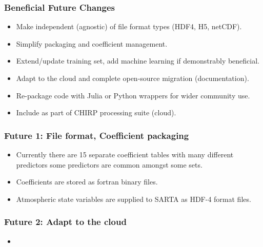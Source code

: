 \documentclass[10pt,t]{beamer}
\begin{document}
\begin{frame}
\end{frame}

\begin{frame}
  \frametitle{Beneficial Future Changes}
  \begin{itemize}
    \item Make independent (agnostic) of file format types (HDF4, H5, netCDF).
    \item Simplify packaging and coefficient management.
    \item Extend/update training set, add machine learning if demonstrably beneficial.
    \item Adapt to the cloud and complete open-source migration (documentation).
    \item Re-package code with Julia or Python wrappers for wider community use.
    \item Include as part of CHIRP processing suite (cloud).

\end{itemize}
\end{frame}

\begin{frame}
  \frametitle{Future 1: File format, Coefficient packaging}
  \begin{itemize}
    \item Currently there are 15 separate coefficient tables with many different predictors
      some predictors are common amongst some sets.
    \item Coefficients are stored as fortran binary files.
    \item Atmospheric state variables are supplied to SARTA as HDF-4 format files. 
  

  \end{itemize}
\end{frame}

\begin{frame}
  \frametitle{Future 2: Adapt to the cloud}
  \begin{itemize}
    \item

  \end{itemize}
\end{frame}
\end{document}
